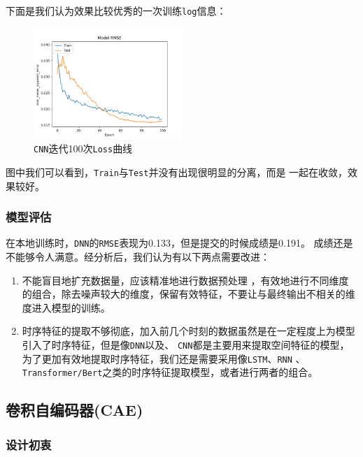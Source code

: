 \documentclass[11pt,a4paper]{elegantpaper}
\begin{document}
\begin{multicols}{2}
下面是我们认为效果比较优秀的一次训练\lstinline{log}信息：

\begin{figure}[H]
  \centering
  \includegraphics[width=0.5\textwidth]{images/RMSE_CNN.png}
  \caption{\lstinline{CNN}迭代100次\lstinline{Loss}曲线} 
\end{figure}

图中我们可以看到，\lstinline{Train}与\lstinline{Test}并没有出现很明显的分离，而是
一起在收敛，效果较好。

\subsubsection{模型评估}

在本地训练时，\lstinline{DNN}的\lstinline{RMSE}表现为0.133，但是提交的时候成绩是0.191。
成绩还是不能够令人满意。经分析后，我们认为有以下两点需要改进：

\begin{enumerate}
  \item 不能盲目地扩充数据量，应该精准地进行数据预处理
  ，有效地进行不同维度的组合，除去噪声较大的维度，保留有效特征，不要让与最终输出不相关的维度进入模型的训练。
  \item 时序特征的提取不够彻底，加入前几个时刻的数据虽然是在一定程度上为模型引入了时序特征，但是像\lstinline{DNN}以及、
  \lstinline{CNN}都是主要用来提取空间特征的模型，为了更加有效地提取时序特征，我们还是需要采用像\lstinline{LSTM}、\lstinline{RNN}
  、\lstinline{Transformer/Bert}之类的时序特征提取模型，或者进行两者的组合。
\end{enumerate}


\subsection{卷积自编码器(CAE)}

\subsubsection{设计初衷}


\end{multicols}
\end{document}
